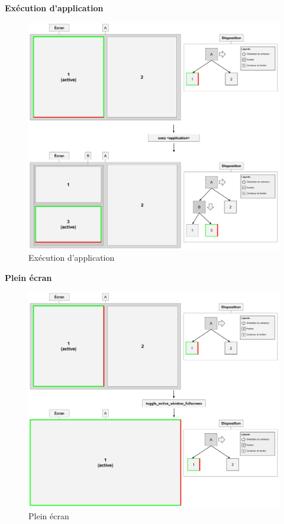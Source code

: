 \documentclass[titlepage]{article}
\begin{document}
\noindent\begin{minipage}{\linewidth}
\textbf{Exécution d'application}
\begin{figure}[H]
	\centering
	\includegraphics[width=\textwidth]{exec.jpg}
	\caption{Exécution d'application}
\end{figure}
\end{minipage}

\noindent\begin{minipage}{\linewidth}
\textbf{Plein écran}
\begin{figure}[H]
	\centering
	\includegraphics[width=\textwidth]{toggle_active_window_fullscreen.jpg}
	\caption{Plein écran}
\end{figure}
\end{minipage}
\end{document}
